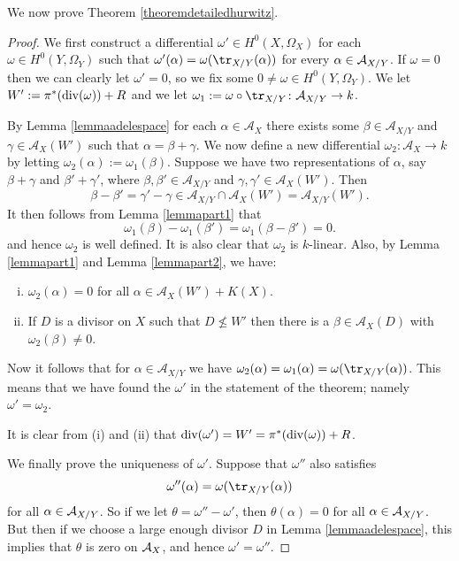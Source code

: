We now prove Theorem \ref{theoremdetailedhurwitz}.


    \begin{proof}
    We first construct a differential $\omega'\in H^0(X,\Omega_X)$ for each $\omega\in H^0(Y,\Omega_Y)$ such that $\omega'(\alpha) = \omega(\tr_{X/Y}(\alpha))$ for every $\alpha \in {\mathcal A}_{X/Y}$.
    If $\omega = 0$ then we can clearly let $\omega' = 0$, so we fix some $0 \neq \omega \in H^0(Y,\Omega_Y)$.
    We let $W' := \pi^*(\operatorname{div} (\omega)) + R$ and we let $\omega_1:= \omega\circ \tr_{X/Y} \colon \mathcal{A}_{X/Y} \rightarrow k$.
    
    
    By Lemma \ref{lemmaadelespace} for each $\alpha \in \mathcal{A}_X$ there exists some $\beta \in \mathcal{A}_{X/Y}$ and $\gamma \in \mathcal{A}_X(W')$ such that $\alpha = \beta + \gamma$.
    We now define a new differential $\omega_2 \colon  \mathcal{A}_X \rightarrow k$ by letting $\omega_2(\alpha) := \omega_1(\beta)$.
    Suppose we have two representations of $\alpha$, say $\beta+ \gamma$ and $\beta' + \gamma'$, where $\beta, \beta' \in \mathcal{A}_{X/Y}$ and $\gamma, \gamma' \in \mathcal{A}_{X}(W')$.
    Then 
        \[
        \beta - \beta' = \gamma' - \gamma \in \mathcal{A}_{X/Y} \cap \mathcal{A}_X(W') = \mathcal{A}_{X/Y}(W').
        \]
    It then follows from Lemma \ref{lemmapart1} that 
        \[
        \omega_1(\beta) - \omega_1(\beta') = \omega_1(\beta - \beta') = 0.
        \]
    and hence $\omega_2$ is well defined.
    It is also clear that $\omega_2$ is $k$-linear.
    Also, by Lemma \ref{lemmapart1} and Lemma \ref{lemmapart2}, we have:
        \begin{enumerate}[(i)]
        \item $\omega_2(\alpha) = 0$ for all $\alpha \in \mathcal{A}_X(W') + K(X)$.
        \item If $D$ is a divisor on $X$ such that $D\nleq W'$ then there is a $\beta \in \mathcal{A}_X(D)$ with $\omega_2(\beta) \neq 0$.
        \end{enumerate}
    
    
    Now it follows that for $\alpha \in \mathcal{A}_{X/Y}$ we have $\omega_2(\alpha) = \omega_1(\alpha) = \omega(\tr_{X/Y}(\alpha))$.
    This means that we have found the $\omega'$ in the statement of the theorem; namely $\omega' = \omega_2$.
    
    It is clear from (i) and (ii) that $\operatorname{div}(\omega') = W' = \pi^*(\operatorname{div}(\omega)) + R$.
    
    We finally prove the uniqueness of $\omega'$.
    Suppose that $\omega''$ also satisfies 
        \[
        \omega''(\alpha) = \omega(\tr_{X/Y}(\alpha))
        \]
    for all $\alpha\in {\mathcal A}_{X/Y}$.
    So if we let $\theta = \omega'' - \omega'$, then $\theta(\alpha) = 0$ for all $\alpha \in {\mathcal A}_{X/Y}$.
    But then if we choose a large enough divisor $D$ in Lemma \ref{lemmaadelespace}, this implies that $\theta$ is zero on ${\mathcal A}_X$, and hence $\omega' = \omega''$.
    \end{proof}





